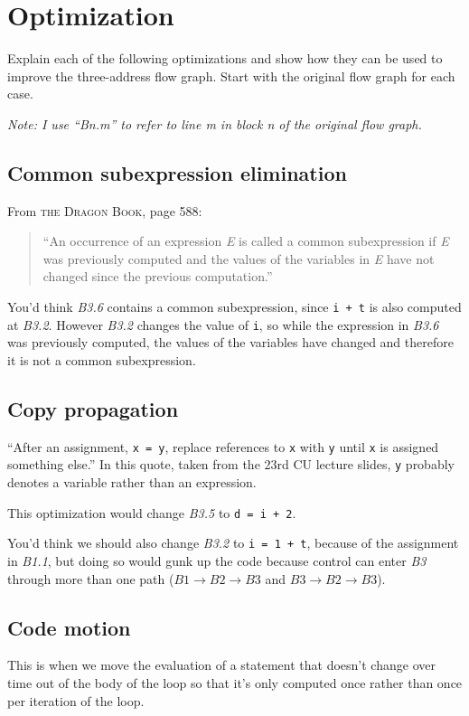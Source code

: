 \section{Optimization}
Explain each of the following optimizations and show how they can be used to improve the three-address flow graph.
Start with the original flow graph for each case.

\emph{Note: I use ``Bn.m'' to refer to line m in block n of the original flow graph.}
\subsection{Common subexpression elimination}
From \textsc{the Dragon Book}, page 588:
\begin{quote}
``An occurrence of an expression \emph{E} is called a common subexpression if \emph{E} was previously computed and the values of the variables in \emph{E} have not changed since the previous computation.''
\end{quote}

You'd think \textit{B3.6} contains a common subexpression, since \texttt{i + t} is also computed at \textit{B3.2}.
However \textit{B3.2} changes the value of \texttt{i}, so while the expression in \textit{B3.6} was previously computed, the values of the variables have changed and therefore it is not a common subexpression.

\subsection{Copy propagation}
``After an assignment, \texttt{x = y}, replace references to \texttt{x} with \texttt{y} until \texttt{x} is assigned something else.''
In this quote, taken from the 23rd CU lecture slides, \texttt{y} probably denotes a variable rather than an expression.

This optimization would change \textit{B3.5} to \texttt{d = i + 2}.

You'd think we should also change \textit{B3.2} to \texttt{i = 1 + t}, because of the assignment in \textit{B1.1}, but doing so would gunk up the code because control can enter \textit{B3} through more than one path ($\mathit{B1} \rightarrow \mathit{B2} \rightarrow \mathit{B3}$ and $\mathit{B3} \rightarrow \mathit{B2} \rightarrow \mathit{B3}$).

\subsection{Code motion}
This is when we move the evaluation of a statement that doesn't change over time out of the body of the loop so that it's only computed once rather than once per iteration of the loop.

